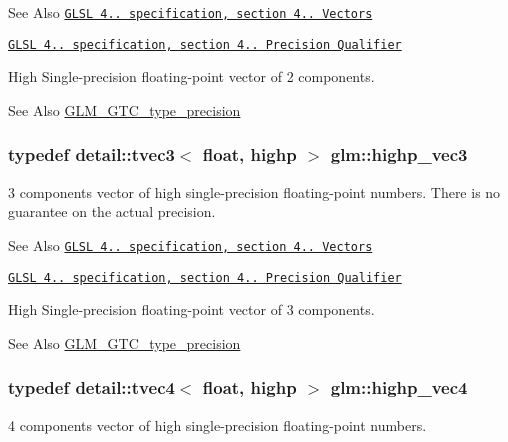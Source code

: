 \begin{DoxySeeAlso}{See Also}
\href{http://www.opengl.org/registry/doc/GLSLangSpec.4.20.8.pdf}{\tt G\-L\-S\-L 4.. specification, section 4.. Vectors} 

\href{http://www.opengl.org/registry/doc/GLSLangSpec.4.20.8.pdf}{\tt G\-L\-S\-L 4.. specification, section 4.. Precision Qualifier}
\end{DoxySeeAlso}
High Single-\/precision floating-\/point vector of 2 components. \begin{DoxySeeAlso}{See Also}
\hyperlink{group__gtc__type__precision}{G\-L\-M\-\_\-\-G\-T\-C\-\_\-type\-\_\-precision} 
\end{DoxySeeAlso}
\hypertarget{group__core__precision_ga4879124da7a18d6b681d933cb8c4267d}{
\subsubsection[{highp\-\_\-vec3}]{\setlength{\rightskip}{0pt plus 5cm}typedef detail\-::tvec3$<$ float, highp $>$ {\bf glm\-::highp\-\_\-vec3}}}\label{group__core__precision_ga4879124da7a18d6b681d933cb8c4267d}
3 components vector of high single-\/precision floating-\/point numbers. There is no guarantee on the actual precision.

\begin{DoxySeeAlso}{See Also}
\href{http://www.opengl.org/registry/doc/GLSLangSpec.4.20.8.pdf}{\tt G\-L\-S\-L 4.. specification, section 4.. Vectors} 

\href{http://www.opengl.org/registry/doc/GLSLangSpec.4.20.8.pdf}{\tt G\-L\-S\-L 4.. specification, section 4.. Precision Qualifier}
\end{DoxySeeAlso}
High Single-\/precision floating-\/point vector of 3 components. \begin{DoxySeeAlso}{See Also}
\hyperlink{group__gtc__type__precision}{G\-L\-M\-\_\-\-G\-T\-C\-\_\-type\-\_\-precision} 
\end{DoxySeeAlso}
\hypertarget{group__core__precision_gae32d5f99860247afbe7ed90564bceac1}{
\subsubsection[{highp\-\_\-vec4}]{\setlength{\rightskip}{0pt plus 5cm}typedef detail\-::tvec4$<$ float, highp $>$ {\bf glm\-::highp\-\_\-vec4}}}\label{group__core__precision_gae32d5f99860247afbe7ed90564bceac1}
4 components vector of high single-\/precision floating-\/point numbers.

